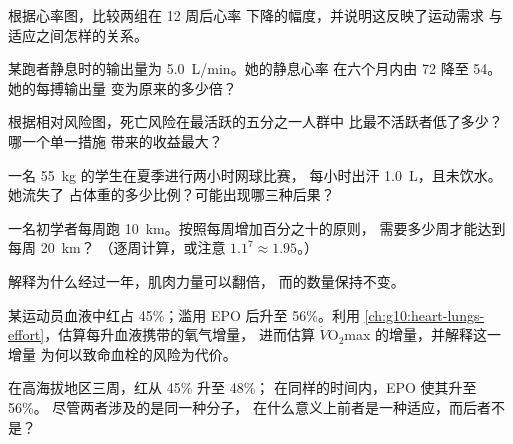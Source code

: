 \begin{exercise}[$\star\star$]\label{exo:g10:sport-and-health:6}
根据心率图，比较两组在 12 周后心率
下降的幅度，并说明这反映了运动需求
与适应之间怎样的关系。
\end{exercise}

\begin{exercise}[$\star\star$]\label{exo:g10:sport-and-health:7}
某跑者静息时的输出量为 \qty{5.0}{L/min}。她的静息心率
在六个月内由 72 降至 54。她的每搏输出量
变为原来的多少倍？
\end{exercise}

\begin{exercise}[$\star\star$]\label{exo:g10:sport-and-health:8}
根据相对风险图，死亡风险在最活跃的五分之一人群中
比最不活跃者低了多少？哪一个单一措施
带来的收益最大？
\end{exercise}

\begin{exercise}[$\star\star$]\label{exo:g10:sport-and-health:9}
一名 \qty{55}{kg} 的学生在夏季进行两小时网球比赛，
每小时出汗 \qty{1.0}{L}，且未饮水。她流失了
占体重的多少比例？可能出现哪三种后果？
\end{exercise}

\begin{exercise}[$\star\star$]\label{exo:g10:sport-and-health:10}
一名初学者每周跑 \qty{10}{km}。按照每周增加百分之十的原则，
需要多少周才能达到每周 \qty{20}{km}？
（逐周计算，或注意 $1.1^7 \approx 1.95$。）
\end{exercise}

\begin{exercise}[$\star\star$]\label{exo:g10:sport-and-health:11}
解释为什么经过一年，肌肉力量可以翻倍，
而的数量保持不变。
\end{exercise}

\begin{exercise}[$\star\star\star$]\label{exo:g10:sport-and-health:12}
某运动员血液中红占 45\%；滥用 EPO 后升至 56\%。利用
\cref{ch:g10:heart-lungs-effort}，估算每升血液携带的氧气增量，
进而估算 $\dot V\!\mathrm{O_2}$max 的增量，并解释这一增量
为何以致命血栓的风险为代价。
\end{exercise}

\begin{exercise}[$\star\star\star$]\label{exo:g10:sport-and-health:13}
在高海拔地区三周，红从 45\% 升至 48\%；
在同样的时间内，EPO 使其升至 56\%。
尽管两者涉及的是同一种分子，
在什么意义上前者是一种适应，而后者不是？
\end{exercise}

